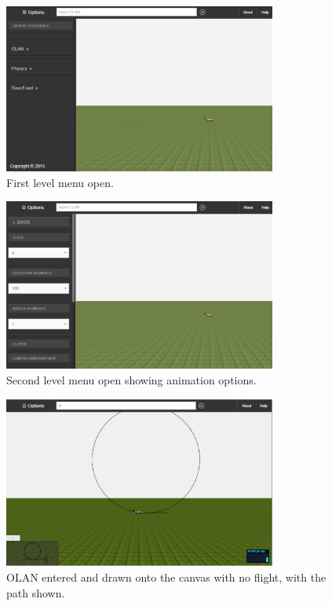 \begin{figure}[h!]
    \centering
    \includegraphics[width=0.8\textwidth]{images/screen2.png}
    \caption{First level menu open.}
\end{figure}

\begin{figure}[h!]
    \centering
    \includegraphics[width=0.8\textwidth]{images/screen3.png}
    \caption{Second level menu open showing animation options.}
\end{figure}

\begin{figure}[h!]
    \centering
    \includegraphics[width=0.8\textwidth]{images/screen4.png}
    \caption{OLAN entered and drawn onto the canvas with no flight, with the path shown.}
\end{figure}

